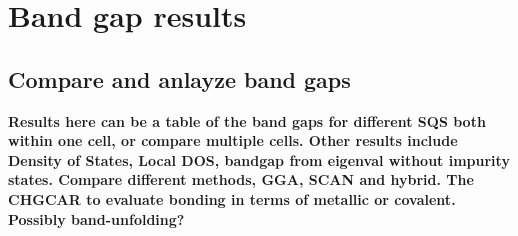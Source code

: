 \chapter{Band gap results}
\label{sec:Eg}

\section{Compare and anlayze band gaps}
\textbf{Results here can be a table of the band gaps for different SQS both within one cell, or compare multiple cells. Other results include Density of States, Local DOS, bandgap from eigenval without impurity states. Compare different methods, GGA, SCAN and hybrid. The CHGCAR to evaluate bonding in terms of metallic or covalent. Possibly band-unfolding? }